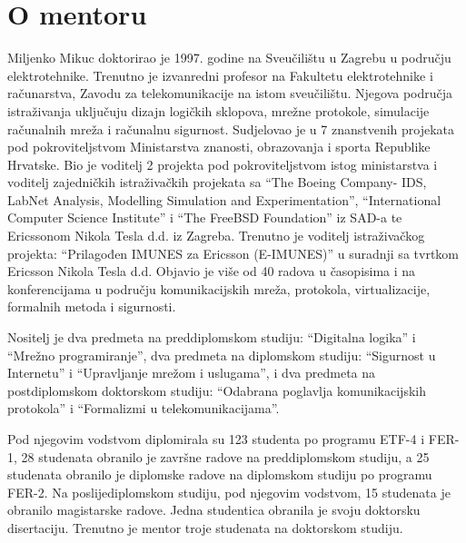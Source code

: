 \thispagestyle{empty}
\section*{O mentoru}

Miljenko Mikuc doktorirao je 1997. godine na Sveučilištu u Zagrebu u području
elektrotehnike. Trenutno je izvanredni profesor na Fakultetu elektrotehnike i
računarstva, Zavodu za telekomunikacije na istom sveučilištu. Njegova područja
istraživanja uključuju dizajn logičkih sklopova, mrežne protokole, simulacije
računalnih mreža i računalnu sigurnost. Sudjelovao je u 7 znanstvenih projekata
pod pokroviteljstvom Ministarstva znanosti, obrazovanja i sporta Republike
Hrvatske. Bio je voditelj 2 projekta pod pokroviteljstvom istog ministarstva i
voditelj zajedničkih istraživačkih projekata sa ``The Boeing Company- IDS, LabNet
Analysis, Modelling Simulation and Experimentation'', ``International Computer
Science Institute'' i ``The FreeBSD Foundation'' iz SAD-a te Ericssonom Nikola
Tesla d.d. iz Zagreba. Trenutno je voditelj istraživačkog projekta: ``Prilagođen
IMUNES za Ericsson (E-IMUNES)'' u suradnji sa tvrtkom Ericsson Nikola Tesla d.d.
Objavio je više od 40 radova u časopisima i na konferencijama u području
komunikacijskih mreža, protokola, virtualizacije, formalnih metoda i sigurnosti.

Nositelj je dva predmeta na preddiplomskom studiju: ``Digitalna logika'' i ``Mrežno
programiranje'', dva predmeta na diplomskom studiju: ``Sigurnost u Internetu'' i
``Upravljanje mrežom i uslugama'', i dva predmeta na postdiplomskom doktorskom
studiju: ``Odabrana poglavlja komunikacijskih protokola'' i ``Formalizmi u
telekomunikacijama''.

Pod njegovim vodstvom diplomirala su 123 studenta po programu ETF-4 i FER-1, 28
studenata obranilo je završne radove na preddiplomskom studiju, a 25
studenata obranilo je diplomske radove na diplomskom studiju po programu FER-2.
Na poslijediplomskom studiju, pod njegovim vodstvom, 15 studenata je obranilo
magistarske radove. Jedna studentica obranila je svoju doktorsku disertaciju.
Trenutno je mentor troje studenata na doktorskom studiju.

\newpage
\thispagestyle{empty}
